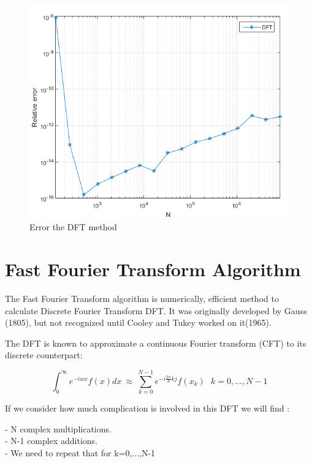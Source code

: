 \documentclass[12pt]{report}
\begin{document}
\begin{figure}[H]

\centering
\includegraphics{DFT.png} 
\caption{Error the DFT method}
\end{figure}





\section{Fast Fourier Transform Algorithm}
The Fast Fourier Transform algorithm is numerically, efficient method to calculate Discrete Fourier Transform DFT. It was originally developed by Gauss (1805), but not recognized until Cooley and Tukey worked on it(1965).

The DFT is known to approximate a continuous Fourier transform (CFT) to its discrete counterpart:

\begin{equation}
\int_{0}^{\infty} e^{-iwx}f(x) dx ~\approx ~ \sum \limits_{k=0}^{N-1} e^{-i \frac{2\pi}{N}kj} f(x_k)~~~ k=0,...,N-1
\label{FFT}
\end{equation}


If we consider how much complication is involved in this DFT we will find :

- N complex multiplications.\\
- N-1 complex additions. \\
- We need to repeat that for k=0,...,N-1\\
\end{document}
